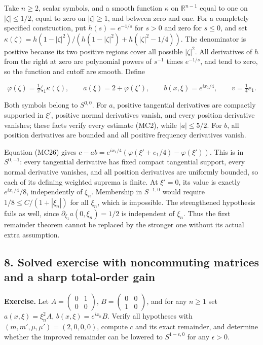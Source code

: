 \documentclass[
  11pt,
]{article}
\begin{document}
Take \(n\geq2\), scalar symbols, and a smooth function \(\kappa\) on
\(\mathbb R^{n-1}\) equal to one on \(|\zeta|\leq1/2\), equal to zero on
\(|\zeta|\geq1\), and between zero and one. For a completely specified
construction, put \(h(s)=e^{-1/s}\) for \(s>0\) and zero for \(s\leq0\),
and set
\(\kappa(\zeta)=h(1-|\zeta|^2)/(h(1-|\zeta|^2)+h(|\zeta|^2-1/4))\). The
denominator is positive because its two positive regions cover all
possible \(|\zeta|^2\). All derivatives of \(h\) from the right at zero
are polynomial powers of \(s^{-1}\) times \(e^{-1/s}\), and tend to
zero, so the function and cutoff are smooth. Define

\[
\varphi(\zeta)=\tfrac12\zeta_1\kappa(\zeta),\qquad
a(\xi)=2+\varphi(\xi'),\qquad
b(x,\xi)=e^{ix_1/4},\qquad v=\tfrac14 e_1.
\tag{MC27}
\]

Both symbols belong to \(S^{0,0}\). For \(a\), positive tangential
derivatives are compactly supported in \(\xi'\), positive normal
derivatives vanish, and every position derivative vanishes; these facts
verify every estimate (MC2), while \(|a|\leq5/2\). For \(b\), all
position derivatives are bounded and all positive frequency derivatives
vanish.

Equation (MC26) gives
\(c-ab=e^{ix_1/4}(\varphi(\xi'+e_1/4)-\varphi(\xi'))\). This is in
\(S^{0,-1}\): every tangential derivative has fixed compact tangential
support, every normal derivative vanishes, and all position derivatives
are uniformly bounded, so each of its defining weighted suprema is
finite. At \(\xi'=0\), its value is exactly \(e^{ix_1/4}/8\),
independently of \(\xi_n\). Membership in \(S^{-1,0}\) would require
\(1/8\leq C/(1+|\xi_n|)\) for all \(\xi_n\), which is impossible. The
strengthened hypothesis fails as well, since
\(\partial_{\xi_1}a(0,\xi_n)=1/2\) is independent of \(\xi_n\). Thus the
first remainder theorem cannot be replaced by the stronger one without
its actual extra assumption.

\subsection{8. Solved exercise with noncommuting matrices and a sharp
total-order
gain}\label{solved-exercise-with-noncommuting-matrices-and-a-sharp-total-order-gain}

\textbf{Exercise.} Let \(A=\begin{pmatrix}0&1\\0&0\end{pmatrix}\),
\(B=\begin{pmatrix}0&0\\1&0\end{pmatrix}\), and for any \(n\geq1\) set
\(a(x,\xi)=\xi_n^2A\), \(b(x,\xi)=e^{ix_n}B\). Verify all hypotheses
with \((m,m',\mu,\mu')=(2,0,0,0)\), compute \(c\) and its exact
remainder, and determine whether the improved remainder can be lowered
to \(S^{1-\epsilon,0}\) for any \(\epsilon>0\).
\end{document}
